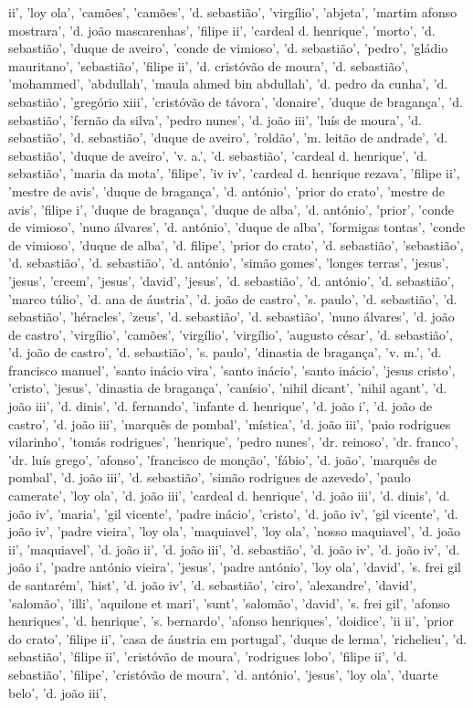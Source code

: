 \documentclass{article}
\begin{document}
\begin{itemize}
ii', 'loy ola', 'camões', 'camões', 'd. sebastião', 'virgílio', 'abjeta', 'martim afonso mostrara', 'd. joão mascarenhas', 'filipe ii', 'cardeal d. henrique', 'morto', 'd. sebastião', 'duque de aveiro', 'conde de vimioso', 'd. sebastião', 'pedro', 'gládio mauritano', 'sebastião', 'filipe ii', 'd. cristóvão de moura', 'd. sebastião', 'mohammed', 'abdullah', 'maula ahmed bin abdullah', 'd. pedro da cunha', 'd. sebastião', 'gregório xiii', 'cristóvão de távora', 'donaire', 'duque de bragança', 'd. sebastião', 'fernão da silva', 'pedro nunes', 'd. joão iii', 'luís de moura', 'd. sebastião', 'd. sebastião', 'duque de aveiro', 'roldão', 'm. leitão de andrade', 'd. sebastião', 'duque de aveiro', 'v. a.', 'd. sebastião', 'cardeal d. henrique', 'd. sebastião', 'maria da mota', 'filipe', 'iv iv', 'cardeal d. henrique rezava', 'filipe ii', 'mestre de avis', 'duque de bragança', 'd. antónio', 'prior do crato', 'mestre de avis', 'filipe i', 'duque de bragança', 'duque de alba', 'd. antónio', 'prior', 'conde de vimioso', 'nuno álvares', 'd. antónio', 'duque de alba', 'formigas tontas', 'conde de vimioso', 'duque de alba', 'd. filipe', 'prior do crato', 'd. sebastião', 'sebastião', 'd. sebastião', 'd. sebastião', 'd. antónio', 'simão gomes', 'longes terras', 'jesus', 'jesus', 'creem', 'jesus', 'david', 'jesus', 'd. sebastião', 'd. antónio', 'd. sebastião', 'marco túlio', 'd. ana de áustria', 'd. joão de castro', 's. paulo', 'd. sebastião', 'd. sebastião', 'héracles', 'zeus', 'd. sebastião', 'd. sebastião', 'nuno álvares', 'd. joão de castro', 'virgílio', 'camões', 'virgílio', 'virgílio', 'augusto césar', 'd. sebastião', 'd. joão de castro', 'd. sebastião', 's. paulo', 'dinastia de bragança', 'v. m.', 'd. francisco manuel', 'santo inácio vira', 'santo inácio', 'santo inácio', 'jesus cristo', 'cristo', 'jesus', 'dinastia de bragança', 'canísio', 'nihil dicant', 'nihil agant', 'd. joão iii', 'd. dinis', 'd. fernando', 'infante d. henrique', 'd. joão i', 'd. joão de castro', 'd. joão iii', 'marquês de pombal', 'mística', 'd. joão iii', 'paio rodrigues vilarinho', 'tomás rodrigues', 'henrique', 'pedro nunes', 'dr. reinoso', 'dr. franco', 'dr. luís grego', 'afonso', 'francisco de monção', 'fábio', 'd. joão', 'marquês de pombal', 'd. joão iii', 'd. sebastião', 'simão rodrigues de azevedo', 'paulo camerate', 'loy ola', 'd. joão iii', 'cardeal d. henrique', 'd. joão iii', 'd. dinis', 'd. joão iv', 'maria', 'gil vicente', 'padre inácio', 'cristo', 'd. joão iv', 'gil vicente', 'd. joão iv', 'padre vieira', 'loy ola', 'maquiavel', 'loy ola', 'nosso maquiavel', 'd. joão ii', 'maquiavel', 'd. joão ii', 'd. joão iii', 'd. sebastião', 'd. joão iv', 'd. joão iv', 'd. joão i', 'padre antónio vieira', 'jesus', 'padre antónio', 'loy ola', 'david', 's. frei gil de santarém', 'hist', 'd. joão iv', 'd. sebastião', 'ciro', 'alexandre', 'david', 'salomão', 'illi', 'aquilone et mari', 'sunt', 'salomão', 'david', 's. frei gil', 'afonso henriques', 'd. henrique', 's. bernardo', 'afonso henriques', 'doidice', 'ii ii', 'prior do crato', 'filipe ii', 'casa de áustria em portugal', 'duque de lerma', 'richelieu', 'd. sebastião', 'filipe ii', 'cristóvão de moura', 'rodrigues lobo', 'filipe ii', 'd. sebastião', 'filipe', 'cristóvão de moura', 'd. antónio', 'jesus', 'loy ola', 'duarte belo', 'd. joão iii', 
\end{itemize}
\end{document}
